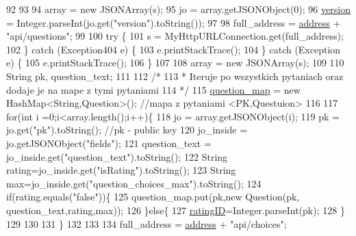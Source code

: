 \begin{DoxyCode}
92             
93 
94         array = \textcolor{keyword}{new} JSONArray(s);
95         jo = array.getJSONObject(0);
96         \hyperlink{classcom_1_1example_1_1qrpoll_1_1_poll_af8617455744b1f5935c9c4042345782c}{version} = Integer.parseInt(jo.get(\textcolor{stringliteral}{"version"}).toString());
97         
98         full\_address = \hyperlink{classcom_1_1example_1_1qrpoll_1_1_poll_a284d664b1db022d0fe8f089c4cad5ead}{address} + \textcolor{stringliteral}{"api/questions"};
99         
100         \textcolor{keywordflow}{try} \{
101             s = MyHttpURLConnection.get(full\_address);
102         \} \textcolor{keywordflow}{catch} (Exception404 e) \{
103             e.printStackTrace();
104         \} \textcolor{keywordflow}{catch} (Exception e) \{
105             e.printStackTrace();
106         \}
107                     
108         array = \textcolor{keyword}{new} JSONArray(s);
109         
110         String pk, question\_text;
111         
112         \textcolor{comment}{/*}
113 \textcolor{comment}{         * Iteruje po wszystkich pytaniach oraz dodaje je na mape z tymi pytaniami}
114 \textcolor{comment}{         */}
115         \hyperlink{classcom_1_1example_1_1qrpoll_1_1_poll_ac4019650bac8ecbf279808dc4d4dae9b}{question\_map} = \textcolor{keyword}{new} HashMap<String,Question>(); \textcolor{comment}{//mapa z pytaniami <PK,Questuion>}
116         
117         \textcolor{keywordflow}{for}(\textcolor{keywordtype}{int} i =0;i<array.length();i++)\{
118             jo = array.getJSONObject(i);
119             pk = jo.get(\textcolor{stringliteral}{"pk"}).toString(); \textcolor{comment}{//pk - public key}
120             jo\_inside = jo.getJSONObject(\textcolor{stringliteral}{"fields"});
121             question\_text = jo\_inside.get(\textcolor{stringliteral}{"question\_text"}).toString();
122             String rating=jo\_inside.get(\textcolor{stringliteral}{"isRating"}).toString();
123             String max=jo\_inside.get(\textcolor{stringliteral}{"question\_choices\_max"}).toString();
124             \textcolor{keywordflow}{if}(rating.equals(\textcolor{stringliteral}{"false"}))\{
125                 question\_map.put(pk,\textcolor{keyword}{new} Question(pk, question\_text,rating,max));
126             \}\textcolor{keywordflow}{else}\{
127                 \hyperlink{classcom_1_1example_1_1qrpoll_1_1_poll_a41aee71def14cf65836f768222a32ba3}{ratingID}=Integer.parseInt(pk);
128             \}
129             
130             
131         \}
132         
133         
134         full\_address = \hyperlink{classcom_1_1example_1_1qrpoll_1_1_poll_a284d664b1db022d0fe8f089c4cad5ead}{address} + \textcolor{stringliteral}{"api/choices"};

\end{DoxyCode}
